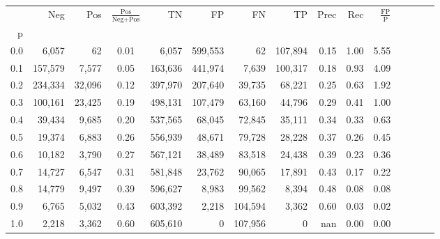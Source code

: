 \begin{tabular}{rrrcrrrrrrrrrrr}
\toprule
{} &      Neg &     Pos & $\frac{\text{Pos}}{\text{Neg}+\text{Pos}}$ &       TN &       FP &       FN &       TP &  Prec &   Rec & $\frac{\text{FP}}{\text{P}}$ \\
p   &          &         &                                            &          &          &          &          &       &       &                              \\
\midrule
0.0 &    6,057 &      62 &                                       0.01 &    6,057 &  599,553 &       62 &  107,894 &  0.15 &  1.00 &                         5.55 \\
0.1 &  157,579 &   7,577 &                                       0.05 &  163,636 &  441,974 &    7,639 &  100,317 &  0.18 &  0.93 &                         4.09 \\
0.2 &  234,334 &  32,096 &                                       0.12 &  397,970 &  207,640 &   39,735 &   68,221 &  0.25 &  0.63 &                         1.92 \\
0.3 &  100,161 &  23,425 &                                       0.19 &  498,131 &  107,479 &   63,160 &   44,796 &  0.29 &  0.41 &                         1.00 \\
0.4 &   39,434 &   9,685 &                                       0.20 &  537,565 &   68,045 &   72,845 &   35,111 &  0.34 &  0.33 &                         0.63 \\
0.5 &   19,374 &   6,883 &                                       0.26 &  556,939 &   48,671 &   79,728 &   28,228 &  0.37 &  0.26 &                         0.45 \\
0.6 &   10,182 &   3,790 &                                       0.27 &  567,121 &   38,489 &   83,518 &   24,438 &  0.39 &  0.23 &                         0.36 \\
0.7 &   14,727 &   6,547 &                                       0.31 &  581,848 &   23,762 &   90,065 &   17,891 &  0.43 &  0.17 &                         0.22 \\
0.8 &   14,779 &   9,497 &                                       0.39 &  596,627 &    8,983 &   99,562 &    8,394 &  0.48 &  0.08 &                         0.08 \\
0.9 &    6,765 &   5,032 &                                       0.43 &  603,392 &    2,218 &  104,594 &    3,362 &  0.60 &  0.03 &                         0.02 \\
1.0 &    2,218 &   3,362 &                                       0.60 &  605,610 &        0 &  107,956 &        0 &   nan &  0.00 &                         0.00 \\
\bottomrule
\end{tabular}
